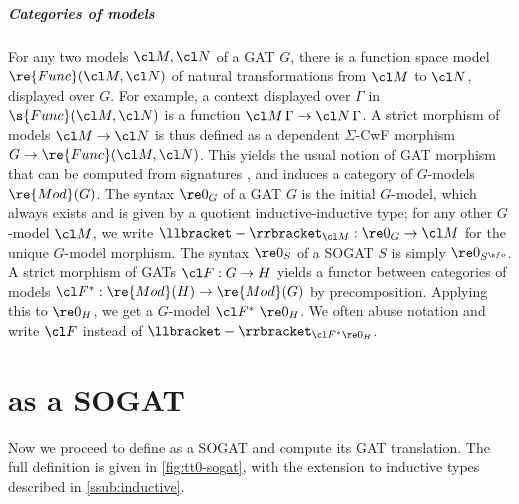 \subparagraph{Categories of models}

For any two models $\cl M, \cl N$ of a GAT $G$, there is a function space model
$\re{Func}(\cl M, \cl N)$ of natural transformations from $\cl M$ to $\cl N$,
displayed over $G$. For example, a context displayed over $\Gamma$ in
$\s{Func}(\cl M, \cl N)$ is a function $\cl M\, \Gamma \to \cl N\, \Gamma$. A
strict morphism of models $\cl M \to \cl N$ is thus defined as a dependent
$\Sigma$-CwF morphism $G \to \re{Func}(\cl M, \cl N)$. This yields the usual
notion of GAT morphism that can be computed from signatures
\cite{Kovacs2023-gq}, and induces a category of $G$-models $\re{Mod}(G)$. The
syntax $\re 0_G$ of a GAT $G$ is the initial $G$-model, which always exists and
is given by a quotient inductive-inductive type; for any other $G$-model $\cl
M$, we write $\llbracket-\rrbracket_{\cl M} : \re 0_G \to \cl M$ for the unique
$G$-model morphism. The syntax $\re 0_S$ of a SOGAT $S$ is simply $\re 0_{S^{\s
fo}}$. A strict morphism\label{rem:morphisms} of GATs $\cl F : G \to H$ yields a
functor between categories of models $\cl F^* : \re{Mod}(H) \to \re{Mod}(G)$ by
precomposition. Applying this to $\re 0_H$, we get a
$G$-model $\cl F^*\ \re 0_H$. We often abuse notation and write $\cl F$ instead of $\llbracket - \rrbracket_{\cl F^* \re 0_H}$.

\section{\ZTT as a SOGAT}\label{sec:itt-sogat}

Now we proceed to define \ZTT as a SOGAT and compute its GAT translation. The
full definition is given in \cref{fig:tt0-sogat}, with the extension to
inductive types described in \cref{ssub:inductive}.

